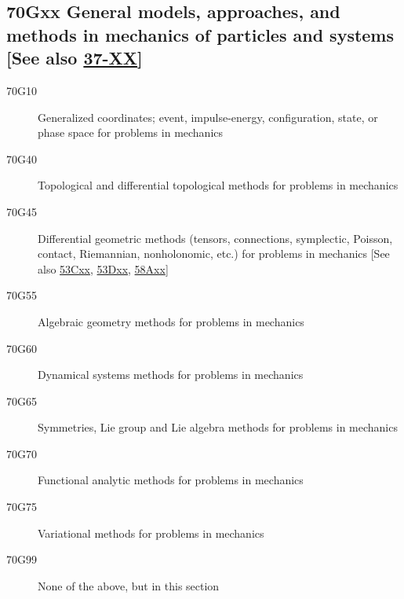\documentclass[letterpaper]{article}
\begin{document}
\subsection*{70Gxx  General models, approaches, and methods in mechanics of particles and systems [See also \hyperref[37-XX]{37-XX}] }\label{70Gxx}
\begin{description}  
\item [70G10]\label{70G10} Generalized coordinates; event, impulse-energy, configuration, state, or phase space for problems in mechanics
\item [70G40]\label{70G40} Topological and differential topological methods for problems in mechanics
\item [70G45]\label{70G45} Differential geometric methods (tensors, connections, symplectic, Poisson, contact, Riemannian, nonholonomic, etc.) for problems in mechanics [See also \hyperref[53Cxx]{53Cxx}, \hyperref[53Dxx]{53Dxx}, \hyperref[58Axx]{58Axx}]
\item [70G55]\label{70G55} Algebraic geometry methods for problems in mechanics
\item [70G60]\label{70G60} Dynamical systems methods for problems in mechanics
\item [70G65]\label{70G65} Symmetries, Lie group and Lie algebra methods for problems in mechanics
\item [70G70]\label{70G70} Functional analytic methods for problems in mechanics
\item [70G75]\label{70G75} Variational methods for problems in mechanics
\item [70G99]\label{70G99} None of the above, but in this section
\end{description}
\end{document}
